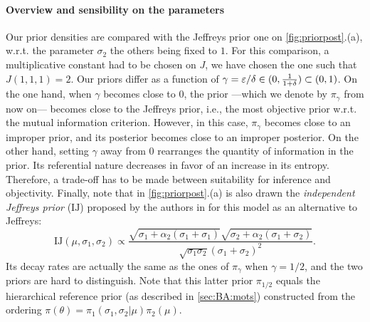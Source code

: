 \paragraph{Overview and sensibility on the parameters}
Our prior densities are compared with the Jeffreys prior one on \cref{fig:priorpost}.(a), w.r.t. the parameter $\sigma_2$ the others being fixed to $1$. For this comparison, a multiplicative constant had to be chosen on $J$, we have chosen the one such that $J(1,1,1)=2$.
Our priors differ as a function of $\gamma=\varepsilon/\delta\in(0,\frac{1}{1+\delta})\subset(0,1)$. On the one hand, when $\gamma$ becomes close to $0$, the prior ---which we denote by $\pi_\gamma$ from now on--- becomes close to the Jeffreys prior, i.e., the most objective prior w.r.t. the mutual information criterion. However, in this case, $\pi_\gamma$ becomes close to an improper prior, and its posterior becomes close to an improper posterior. On the other hand, setting $\gamma$ away from $0$ 
rearranges the quantity of information in the prior. Its referential nature decreases in favor of an increase in its entropy.
Therefore, a trade-off has to be made between suitability for inference and objectivity.
Finally, note that in \cref{fig:priorpost}.(a) is also drawn the \emph{independent Jeffreys prior} ($\text{IJ}$) proposed by the authors in \cite{rubio_inference_2014} for this model as an alternative to Jeffreys:
        \begin{equation}
            \text{IJ}(\mu,\sigma_1,\sigma_2) \propto \frac{\sqrt{\sigma_1+\alpha_2(\sigma_1+\sigma_1)}\sqrt{\sigma_2+\alpha_2(\sigma_1+\sigma_2)}}{\sqrt{\sigma_1\sigma_2}(\sigma_1+\sigma_2)^2}.
        \end{equation}
Its decay rates are actually the same as the ones of $\pi_\gamma$ when $\gamma=1/2$, and the two priors are hard to distinguish. Note that this latter prior $\pi_{1/2}$ equals the hierarchical reference prior (as described in  \cref{sec:BA:mots}) constructed from the ordering $\pi(\theta)=\pi_1(\sigma_1,\sigma_2|\mu)\pi_2(\mu)$.




